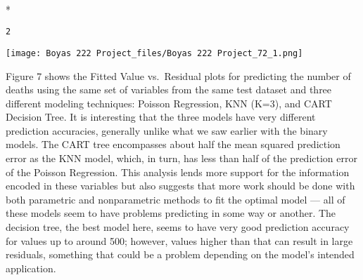 \documentclass[letterpaper,10pt,english]{/usr/share/sphinx/texinputs/sphinxhowto}
\def\smaller{\fontsize{9.5pt}{9.5pt}\selectfont}
\newenvironment{InvisibleVerbatim}
        {\begin{mdframed}[leftmargin=0.1\linewidth,innerleftmargin=3pt,innerrightmargin=3pt, userdefinedwidth=1\linewidth, linewidth=0pt, linecolor=white, usetwoside=false]}
        {\end{mdframed}}
\begin{document}
        

            
                \makebox[0.1\linewidth]{\smaller\hfill\tt\color{nbframe-out-prompt}Out\hspace{4pt}{[}25{]}:\hspace{4pt}}\\*
                \vspace{-2.55\baselineskip}\begin{InvisibleVerbatim}
                \vspace{-0.5\baselineskip}
\begin{alltt}2\end{alltt}

            \end{InvisibleVerbatim}
            
                \begin{InvisibleVerbatim}
                \vspace{-0.5\baselineskip}
    \begin{center}
    \texttt{[image: Boyas 222 Project\_files/Boyas 222 Project\_72\_1.png]}
    \par
    \end{center}
    
            \end{InvisibleVerbatim}
            
        
    
Figure 7 shows the Fitted Value vs.~Residual plots for predicting the
number of deaths using the same set of variables from the same test
dataset and three different modeling techniques: Poisson Regression, KNN
(K=3), and CART Decision Tree. It is interesting that the three models
have very different prediction accuracies, generally unlike what we saw
earlier with the binary models. The CART tree encompasses about half the
mean squared prediction error as the KNN model, which, in turn, has less
than half of the prediction error of the Poisson Regression. This
analysis lends more support for the information encoded in these
variables but also suggests that more work should be done with both
parametric and nonparametric methods to fit the optimal model --- all of
these models seem to have problems predicting in some way or another.
The decision tree, the best model here, seems to have very good
prediction accuracy for values up to around 500; however, values higher
than that can result in large residuals, something that could be a
problem depending on the model's intended application.
\end{document}

